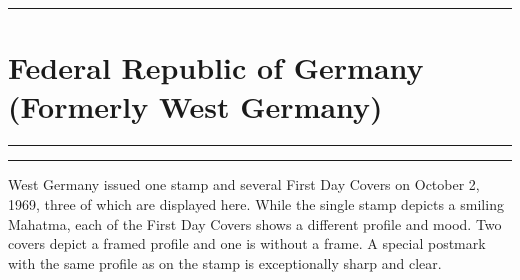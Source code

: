\documentclass[a4paper]{article}
\begin{document}
  \hrule
\section*{Federal Republic of Germany {\small (Formerly West Germany)}}
\vspace{8pt}
\hrule
\vspace{14cm}
\hfill
\begin{minipage}{8cm} \hrule \vspace{12pt} West Germany issued one
  stamp and several First Day Covers on October 2, 1969, three of
  which are displayed here. While the single stamp depicts a smiling
  Mahatma, each of the First Day Covers shows a different profile and
  mood. Two covers depict a framed profile and one is without a
  frame. A special postmark with the same profile as on the stamp is
  exceptionally sharp and clear.
\end{minipage}

\end{document}
